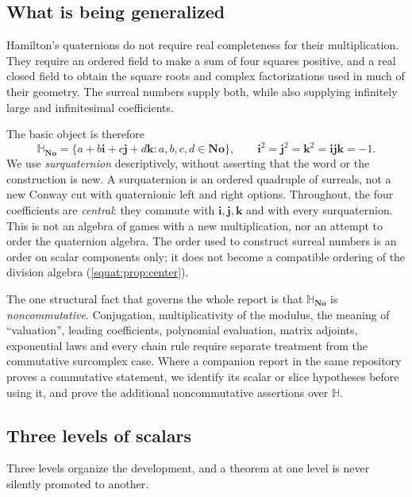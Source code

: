 \documentclass[11pt,letterpaper]{article}
\numberwithin{equation}{section}
\theoremstyle{definition}
\theoremstyle{remark}
\newcommand{\No}{\mathbf{No}}
\newcommand{\SQ}{\mathbb H_{\No}}
\newcommand{\ii}{\mathbf i}
\newcommand{\jj}{\mathbf j}
\newcommand{\kk}{\mathbf k}
\begin{document}
\subsection{What is being generalized}\label{squat:sub:whatgen}
Hamilton's quaternions do not require real completeness for their multiplication. They
require an ordered field to make a sum of four squares positive, and a real closed field
to obtain the square roots and complex factorizations used in much of their geometry.
The surreal numbers supply both, while also supplying infinitely large and infinitesimal
coefficients.

The basic object is therefore
\begin{equation}\label{squat:eq:defn}
 \SQ=\{a+b\ii+c\jj+d\kk:a,b,c,d\in\No\},\qquad
 \ii^2=\jj^2=\kk^2=\ii\jj\kk=-1 .
\end{equation}
We use \emph{surquaternion} descriptively, without asserting that the word or the
construction is new. A surquaternion is an ordered quadruple of surreals, not a new
Conway cut with quaternionic left and right options. Throughout, the four coefficients
are \emph{central}: they commute with $\ii,\jj,\kk$ and with every surquaternion. This
is not an algebra of games with a new multiplication, nor an attempt to order the
quaternion algebra. The order used to construct surreal numbers is an order on scalar
components only; it does not become a compatible ordering of the division algebra
(\cref{squat:prop:center}).

The one structural fact that governs the whole report is that $\SQ$ is
\emph{noncommutative}. Conjugation, multiplicativity of the modulus, the meaning of
``valuation'', leading coefficients, polynomial evaluation, matrix adjoints, exponential
laws and every chain rule require separate treatment from the commutative surcomplex
case. Where a companion report in the same repository proves a commutative statement, we
identify its scalar or slice hypotheses before using it, and prove the additional
noncommutative assertions over $\mathbb H$.

\subsection{Three levels of scalars}\label{squat:sub:levels}
Three levels organize the development, and a theorem at one level is never silently
promoted to another.
\end{document}
